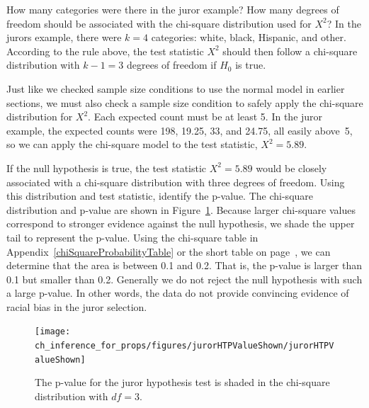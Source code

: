 \begin{example}{How many categories were there in the juror example? How many degrees of freedom should be associated with the chi-square distribution used for $X^2$?}
In the jurors example, there were $k=4$ categories: white, black, Hispanic, and other. According to the rule above, the test statistic $X^2$ should then follow a chi-square distribution with $k-1 = 3$ degrees of freedom if $H_0$ is true.
\end{example}

Just like we checked sample size conditions to use the normal model in earlier sections, we must also check a sample size condition to safely apply the chi-square distribution for $X^2$. Each expected count must be at least 5. In the juror example, the expected counts were 198, 19.25, 33, and 24.75, all easily above~5, so we can apply the chi-square model to the test statistic, $X^2=5.89$.

\begin{example}{If the null hypothesis is true, the test statistic $X^2=5.89$ would be closely associated with a chi-square distribution with three degrees of freedom. Using this distribution and test statistic, identify the p-value.}
The chi-square distribution and p-value are shown in Figure~\ref{jurorHTPValueShown}. Because larger chi-square values correspond to stronger evidence against the null hypothesis, we shade the upper tail to represent the p-value. Using the chi-square table in Appendix~\ref{chiSquareProbabilityTable} or the short table on page~\pageref{chiSquareProbabilityTableShort}, we can determine that the area is between 0.1 and 0.2. That is, the p-value is larger than 0.1 but smaller than 0.2. Generally we do not reject the null hypothesis with such a large p-value. In other words, the data do not provide convincing evidence of racial bias in the juror selection.
\end{example}

\begin{figure}[h]
\centering
\texttt{[image: ch\_inference\_for\_props/figures/jurorHTPValueShown/jurorHTPValueShown]}
\caption{The p-value for the juror hypothesis test is shaded in the chi-square distribution with $df=3$.}
\label{jurorHTPValueShown}
\end{figure}

